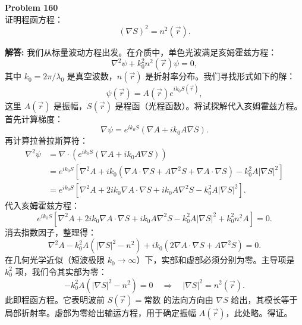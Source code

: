 \documentclass[12pt, a4paper, oneside]{ctexart}
\newenvironment{solution}{\par\noindent\textbf{解答:}\quad}{\par}
\begin{document}
\begin{mdframed}[backgroundcolor=gray!10, linewidth=0pt]
    \textbf{Problem 160} \\
    证明程函方程：
    \[
    (\nabla S)^2 = n^2(\vec{r}).
    \]
\end{mdframed}
\begin{solution}
    我们从标量波动方程出发。在介质中，单色光波满足亥姆霍兹方程：
    \[
    \nabla^2 \psi + k_0^2 n^2(\vec{r}) \psi = 0,
    \]
    其中 $k_0 = 2\pi/\lambda_0$ 是真空波数，$n(\vec{r})$ 是折射率分布。我们寻找形式如下的解：
    \[
    \psi(\vec{r}) = A(\vec{r}) e^{i k_0 S(\vec{r})},
    \]
    这里 $A(\vec{r})$ 是振幅，$S(\vec{r})$ 是程函（光程函数）。将试探解代入亥姆霍兹方程。首先计算梯度：
    \[
    \nabla \psi = e^{i k_0 S} (\nabla A + i k_0 A \nabla S).
    \]
    再计算拉普拉斯算符：
    \begin{align*}
        \nabla^2 \psi &= \nabla \cdot (e^{i k_0 S} (\nabla A + i k_0 A \nabla S)) \\
        &= e^{i k_0 S} [\nabla^2 A + i k_0 (\nabla A \cdot \nabla S + A \nabla^2 S + \nabla A \cdot \nabla S) - k_0^2 A |\nabla S|^2] \\
        &= e^{i k_0 S} [\nabla^2 A + 2i k_0 \nabla A \cdot \nabla S + i k_0 A \nabla^2 S - k_0^2 A |\nabla S|^2].
    \end{align*}
    代入亥姆霍兹方程：
    \[
    e^{i k_0 S} [\nabla^2 A + 2i k_0 \nabla A \cdot \nabla S + i k_0 A \nabla^2 S - k_0^2 A |\nabla S|^2 + k_0^2 n^2 A] = 0.
    \]
    消去指数因子，整理得：
    \[
    \nabla^2 A - k_0^2 A (|\nabla S|^2 - n^2) + i k_0 (2 \nabla A \cdot \nabla S + A \nabla^2 S) = 0.
    \]
    在几何光学近似（短波极限 $k_0 \to \infty$）下，实部和虚部必须分别为零。主导项是 $k_0^2$ 项，我们令其实部为零：
    \[
    -k_0^2 A (|\nabla S|^2 - n^2) = 0 \quad \Rightarrow \quad |\nabla S|^2 = n^2(\vec{r}).
    \]
    此即程函方程。它表明波前 $S(\vec{r})=\text{常数}$ 的法向方向由 $\nabla S$ 给出，其模长等于局部折射率。虚部为零给出输运方程，用于确定振幅 $A(\vec{r})$，此处略。得证。
\end{solution}
\end{document}
